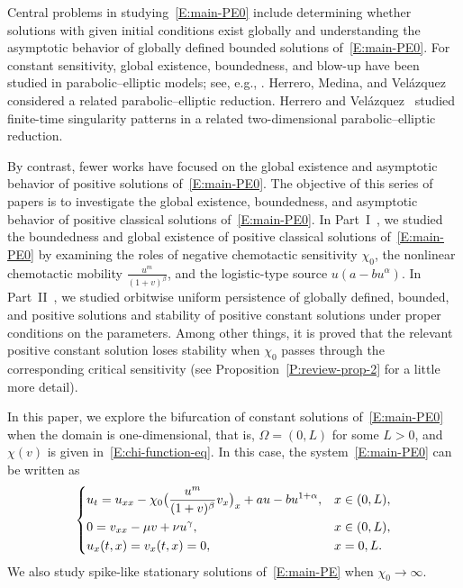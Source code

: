 \documentclass[11pt]{article} %
\theoremstyle{remark}
\theoremstyle{remark}
\numberwithin{equation}{section}
\numberwithin{figure}{section}
\numberwithin{table}{section}
\begin{document}
Central problems in studying~\eqref{E:main-PE0} include determining whether
solutions with given initial conditions exist globally and understanding the
asymptotic behavior of globally defined bounded solutions of~\eqref{E:main-PE0}.
For constant sensitivity, global existence, boundedness, and blow-up have been
studied in parabolic--elliptic models; see, e.g.,
\cite{galakhov.salieva.ea:16:on, nagai:01:blowup, nagai.senba:98:global,
hu.tao:17:boundedness, xiang:19:dynamics, tello.winkler:07:chemotaxis}. Herrero,
Medina, and Vel\'azquez~\cite{herrero.medina.ea:97:finite-time} considered a
related parabolic--elliptic reduction. Herrero and
Vel\'azquez~\cite{herrero.velazquez:96:singularity} studied finite-time
singularity patterns in a related two-dimensional parabolic--elliptic reduction.

By contrast, fewer works have focused on the global existence and asymptotic
behavior of positive solutions of~\eqref{E:main-PE0}. The objective of this
series of papers is to investigate the global existence, boundedness, and
asymptotic behavior of positive classical solutions of~\eqref{E:main-PE0}. In
Part~I~\cite{chen.ruau.ea:26:chemotaxis*1}, we studied the boundedness and
global existence of positive classical solutions of~\eqref{E:main-PE0} by
examining the roles of negative chemotactic sensitivity $\chi_0$, the nonlinear
chemotactic mobility $\frac{u^m}{(1+v)^\beta}$, and the logistic-type source
$u(a - b u^\alpha)$. In Part~II~\cite{chen.ruau.ea:26:chemotaxis}, we studied
orbitwise uniform persistence of globally defined, bounded, and positive
solutions  and stability of positive constant solutions under proper conditions
on the parameters. Among other things, it is proved that the relevant positive
constant solution loses stability when $\chi_0$ passes through the corresponding
critical sensitivity (see Proposition~\ref{P:review-prop-2} for a little more
detail).

In this paper, we explore the bifurcation of constant solutions
of~\eqref{E:main-PE0} when the domain is one-dimensional, that is, $\Omega =
(0,L)$ for some $L > 0$, and $\chi(v)$ is given in~\eqref{E:chi-function-eq}. In
this case, the system~\eqref{E:main-PE0} can be written as
\begin{align}\label{E:main-PE}
  \begin{dcases}
    u_t = u_{xx} -  \chi_0\big(\frac{u^m}{(1+v)^\beta} v_x\big)_x + au - b u^{1+\alpha}, & x \in (0,L), \\
    0=  v_{xx} - \mu v + \nu u^\gamma,                                                   & x \in (0,L), \\
    u_x(t,x) = v_x(t,x) = 0,                                                             & x =0,L.
  \end{dcases}
\end{align}
We also study spike-like stationary solutions of~\eqref{E:main-PE} when $\chi_0
\to \infty$.
\end{document}
